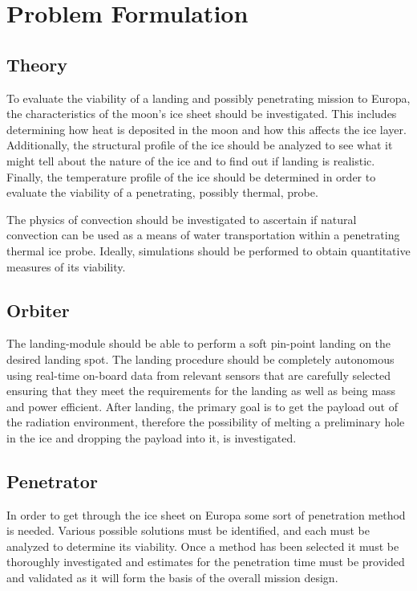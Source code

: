 \chapter{Problem Formulation}

%
%
%

\section{Theory}
To evaluate the viability of a landing and possibly penetrating mission to Europa, the characteristics of the moon's ice sheet should be investigated. This includes determining how heat is deposited in the moon and how this affects the ice layer. Additionally, the structural profile of the ice should be analyzed to see what it might tell about the nature of the ice and to find out if landing is realistic. Finally, the temperature profile of the ice should be determined in order to evaluate the viability of a penetrating, possibly thermal, probe.

The physics of convection should be investigated to ascertain if natural convection can be used as a means of water transportation within a penetrating thermal ice probe. Ideally, simulations should be performed to obtain quantitative measures of its viability.

\section{Orbiter}



The landing-module should be able to perform a soft pin-point landing on the desired landing spot. The landing procedure should be completely autonomous using real-time on-board data from relevant sensors that are carefully selected ensuring that they meet the requirements for the landing as well as being mass and power efficient. After landing, the primary goal is to get the payload out of the radiation environment, therefore the possibility of melting a preliminary hole in the ice and dropping the payload into it, is investigated.

\section{Penetrator}
In order to get through the ice sheet on Europa some sort of penetration method is needed. Various possible solutions must be identified, and each must be analyzed to determine its viability. Once a method has been selected it must be thoroughly investigated and estimates for the penetration time must be provided and validated as it will form the basis of the overall mission design.

